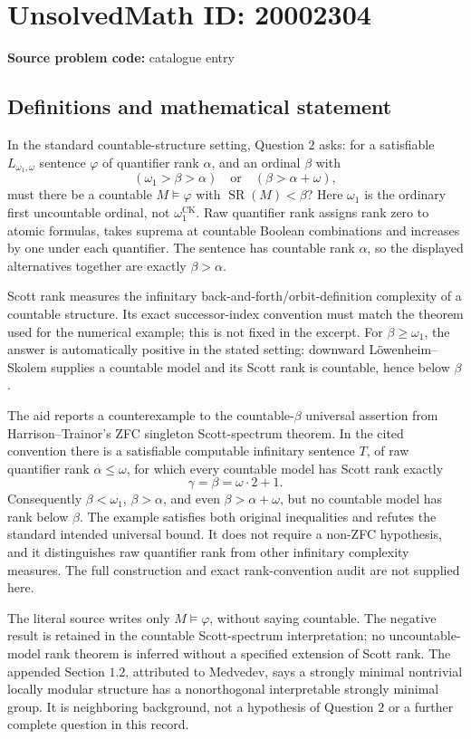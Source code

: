 \documentclass[11pt]{article}
\begin{document}
\section*{UnsolvedMath ID: 20002304}
\textbf{Source problem code:} catalogue entry
\subsection{Definitions and mathematical statement}
In the standard countable-structure setting, Question \(2\) asks: for a satisfiable \(L_{\omega_1,\omega}\) sentence \(\varphi\) of quantifier rank \(\alpha\), and an ordinal \(\beta\) with
\[
 (\omega_1>\beta>\alpha)\quad\text{or}\quad(\beta>\alpha+\omega),
\]
must there be a countable \(M\models\varphi\) with \(\operatorname{SR}(M)<\beta\)? Here \(\omega_1\) is the ordinary first uncountable ordinal, not \(\omega_1^{\mathrm{CK}}\). Raw quantifier rank assigns rank zero to atomic formulas, takes suprema at countable Boolean combinations and increases by one under each quantifier. The sentence has countable rank \(\alpha\), so the displayed alternatives together are exactly \(\beta>\alpha\).

Scott rank measures the infinitary back-and-forth/orbit-definition complexity of a countable structure. Its exact successor-index convention must match the theorem used for the numerical example; this is not fixed in the excerpt. For \(\beta\geq\omega_1\), the answer is automatically positive in the stated setting: downward L\"owenheim--Skolem supplies a countable model and its Scott rank is countable, hence below \(\beta\).

The aid reports a counterexample to the countable-\(\beta\) universal assertion from Harrison--Trainor's ZFC singleton Scott-spectrum theorem. In the cited convention there is a satisfiable computable infinitary sentence \(T\), of raw quantifier rank \(\alpha\leq\omega\), for which every countable model has Scott rank exactly
\[
 \gamma=\beta=\omega\cdot2+1.
\]
Consequently \(\beta<\omega_1\), \(\beta>\alpha\), and even \(\beta>\alpha+\omega\), but no countable model has rank below \(\beta\). The example satisfies both original inequalities and refutes the standard intended universal bound. It does not require a non-ZFC hypothesis, and it distinguishes raw quantifier rank from other infinitary complexity measures. The full construction and exact rank-convention audit are not supplied here.

The literal source writes only \(M\models\varphi\), without saying countable. The negative result is retained in the countable Scott-spectrum interpretation; no uncountable-model rank theorem is inferred without a specified extension of Scott rank. The appended Section \(1.2\), attributed to Medvedev, says a strongly minimal nontrivial locally modular structure has a nonorthogonal interpretable strongly minimal group. It is neighboring background, not a hypothesis of Question \(2\) or a further complete question in this record.
\end{document}
